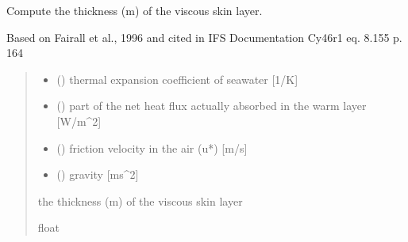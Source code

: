 \documentclass[letterpaper,10pt,english]{sphinxmanual}
\begin{document}
\begin{fulllineitems}
\label{\detokenize{users_guide:AirSeaFluxCode.cs_wl_subs.delta}}
\pysigstartsignatures
\pysiglinewithargsret
{}
{\sphinxparamcomma {}\sphinxparamcomma {}\sphinxparamcomma {}}
{}
\pysigstopsignatures
\sphinxAtStartPar
Compute the thickness (m) of the viscous skin layer.

\sphinxAtStartPar
Based on Fairall et al., 1996 and cited in IFS Documentation Cy46r1
eq. 8.155 p. 164
\begin{quote}\begin{description}
\begin{itemize}
\item {}
\sphinxAtStartPar
{} () \textendash{} thermal expansion coefficient of sea\sphinxhyphen{}water  {[}1/K{]}

\item {}
\sphinxAtStartPar
{} () \textendash{} part of the net heat flux actually absorbed in the warm layer {[}W/m\textasciicircum{}2{]}

\item {}
\sphinxAtStartPar
{} () \textendash{} friction velocity in the air (u*) {[}m/s{]}

\item {}
\sphinxAtStartPar
{} () \textendash{} gravity                      {[}ms\textasciicircum{}\sphinxhyphen{}2{]}

\end{itemize}

\sphinxAtStartPar
{} \textendash{} the thickness (m) of the viscous skin layer

\sphinxAtStartPar
float

\end{description}\end{quote}

\end{fulllineitems}
\end{document}
